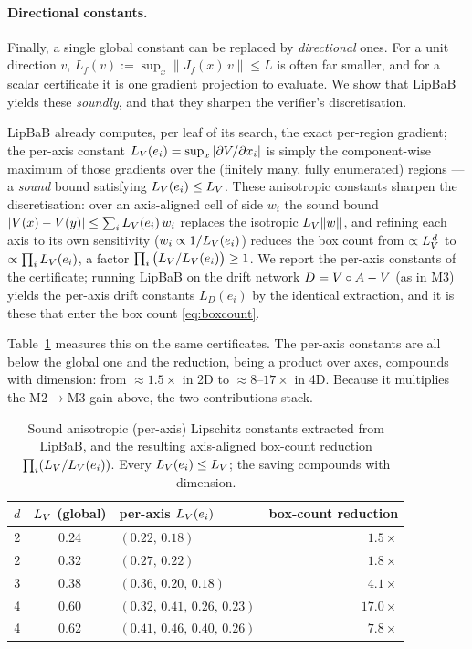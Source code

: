 \paragraph{Directional constants.} Finally, a single global constant can be replaced by \emph{directional} ones. For a unit direction $v$, $L_f(v):=\sup_x\|J_f(x)\,v\|\le L$ is often far smaller, and for a scalar certificate it is one gradient projection to evaluate. We show that LipBaB yields these \emph{soundly}, and that they sharpen the verifier's discretisation.


LipBaB already computes, per leaf of its search, the exact per-region gradient; the per-axis constant $L_V(e_i)=\sup_x|\partial V/\partial x_i|$ is simply the component-wise maximum of those gradients over the (finitely many, fully enumerated) regions --- a \emph{sound} bound satisfying $L_V(e_i)\le L_V$. These anisotropic constants sharpen the discretisation: over an axis-aligned cell of side $w_i$ the sound bound $|V(x)-V(y)|\le\sum_i L_V(e_i)\,w_i$ replaces the isotropic $L_V\|w\|$, and refining each axis to its own sensitivity ($w_i\propto 1/L_V(e_i)$) reduces the box count from $\propto L_V^{\,d}$ to $\propto\prod_i L_V(e_i)$, a factor $\prod_i\big(L_V/L_V(e_i)\big)\ge 1$. We report the per-axis constants of the certificate; running LipBaB on the drift network $D=V\circ A-V$ (as in M3) yields the per-axis drift constants $L_D(e_i)$ by the identical extraction, and it is these that enter the box count \eqref{eq:boxcount}.

Table~\ref{tab:aniso} measures this on the same certificates. The per-axis constants are all below the global one and the reduction, being a product over axes, compounds with dimension: from $\approx1.5\times$ in 2D to $\approx8$--$17\times$ in 4D. Because it multiplies the M2$\to$M3 gain above, the two contributions stack.

\begin{table}[htbp]
\centering
\begin{tabular}{cc l r}
\hline
$d$ & $L_V$ (global) & per-axis $L_V(e_i)$ & box-count reduction \\
\hline
2 & 0.24 & $(0.22,\,0.18)$ & $1.5\times$ \\
2 & 0.32 & $(0.27,\,0.22)$ & $1.8\times$ \\
3 & 0.38 & $(0.36,\,0.20,\,0.18)$ & $4.1\times$ \\
4 & 0.60 & $(0.32,\,0.41,\,0.26,\,0.23)$ & $17.0\times$ \\
4 & 0.62 & $(0.41,\,0.46,\,0.40,\,0.26)$ & $7.8\times$ \\
\hline
\end{tabular}
\caption{Sound anisotropic (per-axis) Lipschitz constants extracted from LipBaB, and the resulting
axis-aligned box-count reduction $\prod_i(L_V/L_V(e_i))$. Every $L_V(e_i)\le L_V$; the saving
compounds with dimension.}
\label{tab:aniso}
\end{table}


